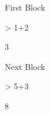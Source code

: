 \documentclass{article}
\begin{document}

First Block
\begin{Schunk}
\begin{Sinput}
> 1+2
\end{Sinput}
\begin{Soutput}
[1] 3
\end{Soutput}
\end{Schunk}

Next Block
\begin{Schunk}
\begin{Sinput}
> 5+3
\end{Sinput}
\begin{Soutput}
[1] 8
\end{Soutput}
\end{Schunk}
\end{document}
